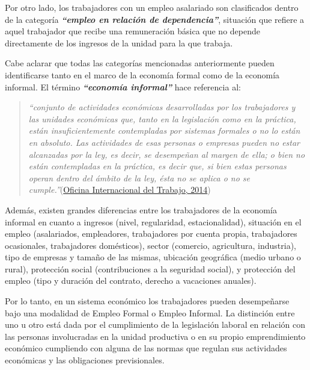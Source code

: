 \documentclass[
  openany]{book}
\begin{document}
Por otro lado, los trabajadores con un empleo asalariado son clasificados dentro de la categoría \textbf{\emph{``empleo en relación de dependencia''}}, situación que refiere a aquel trabajador que recibe una remuneración básica que no depende directamente de los ingresos de la unidad para la que trabaja.

Cabe aclarar que todas las categorías mencionadas anteriormente pueden identificarse tanto en el marco de la economía formal como de la economía informal. El término \textbf{\emph{``economía informal''}} hace referencia al:

\begin{quote}
\emph{``conjunto de actividades económicas desarrolladas por los trabajadores y las unidades económicas que, tanto en la legislación como en la práctica, están insuficientemente contempladas por sistemas formales o no lo están en absoluto. Las actividades de esas personas o empresas pueden no estar alcanzadas por la ley, es decir, se desempeñan al margen de ella; o bien no están contempladas en la práctica, es decir que, si bien estas personas operan dentro del ámbito de la ley, ésta no se aplica o no se cumple.''}(\protect\hyperlink{ref-oitconferencia14}{Oficina Internacional del Trabajo, 2014})
\end{quote}

Además, existen grandes diferencias entre los trabajadores de la economía informal en cuanto a ingresos (nivel, regularidad, estacionalidad), situación en el empleo (asalariados, empleadores, trabajadores por cuenta propia, trabajadores ocasionales, trabajadores domésticos), sector (comercio, agricultura, industria), tipo de empresas y tamaño de las mismas, ubicación geográfica (medio urbano o rural), protección social (contribuciones a la seguridad social), y protección del empleo (tipo y duración del contrato, derecho a vacaciones anuales).

Por lo tanto, en un sistema económico los trabajadores pueden desempeñarse bajo una modalidad de Empleo Formal o Empleo Informal. La distinción entre uno u otro está dada por el cumplimiento de la legislación laboral en relación con las personas involucradas en la unidad productiva o en su propio emprendimiento económico cumpliendo con alguna de las normas que regulan sus actividades económicas y las obligaciones previsionales.
\end{document}
